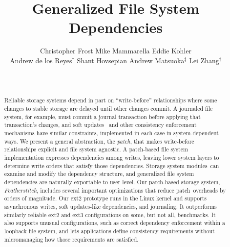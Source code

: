 \documentclass[9pt,twocolumn,letterpaper]{article}
\title{\sffamily\textbf{Generalized File System Dependencies}}
\author{Christopher Frost\assast\asscontact
	\qquad Mike Mammarella\assast\asscontact
	\qquad Eddie Kohler\assast \\
	\sffamily Andrew de los Reyes$^\dag$
	\quad Shant Hovsepian\assast
	\quad Andrew Matsuoka$^\ddag$
	\quad Lei Zhang$^\dag$ \\
	\affaddr{\assast UCLA
	\qquad $^\dag$Google
	\qquad $^\ddag$UT Austin} \\
	\affemail{\href{http://featherstitch.cs.ucla.edu/}{http://featherstitch.cs.ucla.edu/}} \\
}
\date{}
\newcommand{\command}[1]{\emph{#1}}
\newcommand{\Kudos}{Featherstitch}
\newcommand{\Featherstitch}{\Kudos}
\newcommand{\patch}{patch}
\newcommand{\modules}{modules}
\begin{document}
\maketitle


\begin{abstract}

%
Reliable storage systems depend in part on ``write-before''
 relationships where some changes to stable storage are delayed until
 other changes commit.
%
A journaled file system, for example, must commit a
 journal transaction before applying that transaction's changes, and
 soft updates~\cite{ganger00soft} and other consistency enforcement
 mechanisms have similar constraints, implemented in each case in
 system-dependent ways.
%
%
We present a general abstraction, the \emph{\patch}, that makes write-before
 relationships
 explicit and file system agnostic.
%
A \patch-based file system implementation expresses dependencies among
 writes, leaving lower system layers to determine write orders
 that satisfy those dependencies.
%
Storage system \modules\ can examine and modify the dependency
 structure, and %
%
generalized file system dependencies are naturally exportable to
 user level.
%
Our patch-based storage system, \emph{\Featherstitch}, includes several
 important optimizations that reduce \patch\ overheads by orders of magnitude.
%
Our ext2 prototype runs in the Linux kernel and supports asynchronous
 writes, soft updates-like dependencies, and journaling.
%
It outperforms similarly reliable ext2 and ext3
 configurations on some, but not all, benchmarks.
%
It also supports unusual configurations, such as correct dependency
 enforcement within a loopback file system, and lets applications
 define consistency requirements without micromanaging how those
 requirements are satisfied.



\end{abstract}
\end{document}
